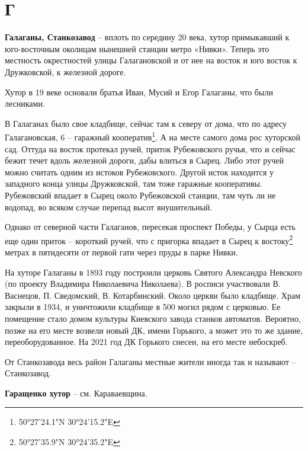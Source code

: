 \chapter*{Г}

\textbf{Галаганы, Станкозавод} – вплоть по середину 20 века, хутор примыкавший к юго-восточ\-ным околицам нынешней станции метро «Нивки». Теперь это местность окрестностей улицы Галагановской и от нее на восток и юго восток к Дружковской, к железной дороге.

Хутор в 19 веке основали братья Иван, Мусий и Егор Галаганы, что были лесниками.

В Галаганах было свое кладбище, сейчас там к северу от дома, что по адресу Галагановская, 6 – гаражный кооператив\footnote{50°27'24.1"N 30°24'15.2"E}. А на месте самого дома рос хуторской сад. Оттуда на восток протекал ручей, приток Рубежовского ручья, что и сейчас бежит течет вдоль железной дороги, дабы влиться в Сырец. Либо этот ручей можно считать одним из истоков Рубежовского. Другой исток находится у западного конца улицы Дружковской, там тоже гаражные кооперативы. Рубежовский впадает в Сырец около Рубежовской станции, там чуть ли не водопад, во всяком случае перепад высот внушительный.

Однако от северной части Галаганов, пересекая проспект Победы, у Сырца есть еще один приток – короткий ручей, что с пригорка впадает в Сырец к востоку\footnote{50°27'35.9"N 30°24'35.2"E} метрах в пятидесяти от первой гати через пруды в парке Нивки.

На хуторе Галаганы в 1893 году построили  церковь Святого Александра Невского (по проекту Владимира Николаевича Николаева). В росписи участвовали В. Васнецов, П. Сведомский, В. Котарбинский. Около церкви было кладбище. Храм закрыли в 1934, и уничтожили кладбище в 500 могил рядом с церковью. Ее помещение стало домом культуры Киевского завода станков автоматов. Вероятно, позже на его месте возвели новый ДК, имени Горького, а может это то же здание, переоборудованное. На 2021 год ДК Горького снесен, на его месте небоскреб.

От Станкозавода весь район Галаганы местные жители иногда так и называют – Станкозавод.\\

\medskip

\textbf{Гаращенко хутор} – см. Караваевщина.\\

\medskip


